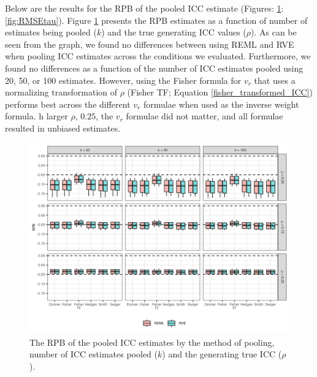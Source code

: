Below are the results for the RPB of the pooled ICC estimate (Figures: \ref{fig:RPBk}:\ref{fig:RMSEtau}). Figure \ref{fig:RPBk} presents the RPB estimates as a function of number of estimates being pooled ($k$) and the true generating ICC values ($\rho$). As can be seen from the graph, we found no differences between using REML and RVE when pooling ICC estimates across the conditions we evaluated. Furthermore, we found no differences as a function of the number of ICC estimates pooled using 20, 50, or 100 estimates. However, using the Fisher formula for $v_r$ that uses a normalizing transformation of $\rho$ (Fisher TF; Equation  \ref{fisher_transformed_ICC}) performs best across the different $v_r$ formulae when used as the inverse weight formula. h larger $\rho$, $0.25$,  the $v_r$ formulae did not matter, and all formulae resulted in unbiased estimates. 
\begin{figure}[h!]
\centerline{\includegraphics{Main/RPB_numICC.png}}
    \caption{The RPB of the pooled ICC estimates by the method of pooling, number of ICC estimates pooled ($k$) and the generating true ICC ($\rho$). \label{fig:RPBk}}
\end{figure}

